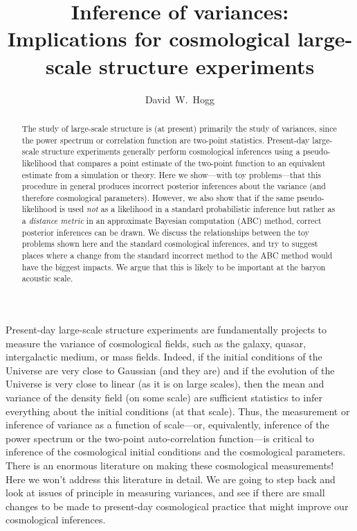 \documentclass[12pt, letterpaper, preprint]{aastex}
\begin{document}
\title{Inference of variances:\\
       Implications for cosmological large-scale structure experiments}
\author{
  David~W.~Hogg
}

\begin{abstract}
The study of large-scale structure is (at present) primarily the study
of variances, since the power spectrum or correlation function are
two-point statistics.
Present-day large-scale structure experiments generally perform
cosmological inferences using a pseudo-likelihood that compares a
point estimate of the two-point function to an equivalent estimate
from a simulation or theory.
Here we show---with toy problems---that this procedure in general
produces incorrect posterior inferences about the variance (and
therefore cosmological parameters).
However, we also show that if the same pseudo-likelihood is used
\emph{not} as a likelihood in a standard probabilistic inference but
rather as a \emph{distance metric} in an approximate Bayesian
computation (ABC) method, correct posterior inferences can be drawn.
We discuss the relationships between the toy problems shown here and
the standard cosmological inferences, and try to suggest places where
a change from the standard incorrect method to the ABC method would
have the biggest impacts.
We argue that this is likely to be important at the baryon acoustic
scale.
\end{abstract}

Present-day large-scale structure experiments are fundamentally
projects to measure the variance of cosmological fields, such as the
galaxy, quasar, intergalactic medium, or mass fields.
Indeed, if the initial conditions of the Universe are very close to
Gaussian (and they are) and if the evolution of the Universe is very
close to linear (as it is on large scales), then the mean and variance
of the density field (on some scale) are sufficient statistics to
infer everything about the initial conditions (at that scale).
Thus, the measurement or inference of variance as a function of
scale---or, equivalently, inference of the power spectrum or the
two-point auto-correlation function---is critical to inference of the
cosmological initial conditions and the cosmological parameters.
There is an enormous literature on making these cosmological
measurements!
Here we won't address this literature in detail.
We are going to step back and look at issues of principle in measuring
variances, and see if there are small changes to be made to
present-day cosmological practice that might improve our cosmological
inferences.
\end{document}
